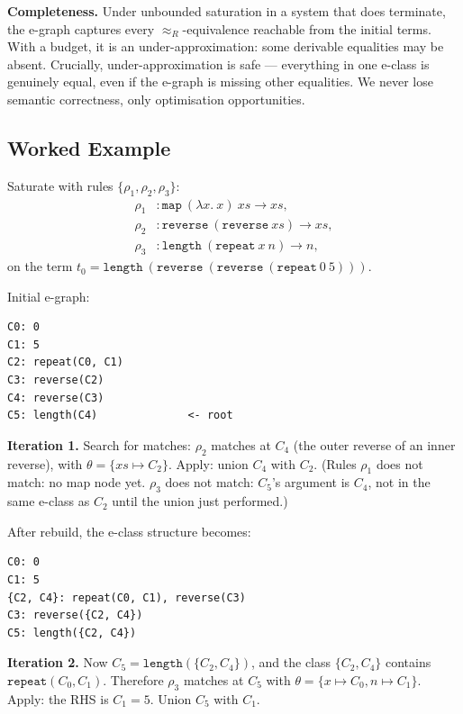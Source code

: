\documentclass[11pt,a4paper]{article}
\begin{document}
\textbf{Completeness.} Under unbounded saturation in a system that does terminate, the e-graph captures every $\approx_R$-equivalence reachable from the initial terms. With a budget, it is an under-approximation: some derivable equalities may be absent. Crucially, under-approximation is safe --- everything in one e-class is genuinely equal, even if the e-graph is missing other equalities. We never lose semantic correctness, only optimisation opportunities.

\subsection{Worked Example}\label{sec:sat-worked}

Saturate with rules $\{\rho_1, \rho_2, \rho_3\}$:
\begin{align*}
\rho_1 &: \mathtt{map}\ (\lambda x.\ x)\ xs \to xs, \\
\rho_2 &: \mathtt{reverse}\ (\mathtt{reverse}\ xs) \to xs, \\
\rho_3 &: \mathtt{length}\ (\mathtt{repeat}\ x\ n) \to n,
\end{align*}
on the term $t_0 = \mathtt{length}\ (\mathtt{reverse}\ (\mathtt{reverse}\ (\mathtt{repeat}\ 0\ 5)))$.

Initial e-graph:

\begin{lstlisting}
C0: 0
C1: 5
C2: repeat(C0, C1)
C3: reverse(C2)
C4: reverse(C3)
C5: length(C4)              <- root
\end{lstlisting}

\textbf{Iteration 1.} Search for matches: $\rho_2$ matches at $C_4$ (the outer reverse of an inner reverse), with $\theta = \{xs \mapsto C_2\}$. Apply: union $C_4$ with $C_2$. (Rules $\rho_1$ does not match: no map node yet. $\rho_3$ does not match: $C_5$'s argument is $C_4$, not in the same e-class as $C_2$ until the union just performed.)

After rebuild, the e-class structure becomes:

\begin{lstlisting}
C0: 0
C1: 5
{C2, C4}: repeat(C0, C1), reverse(C3)
C3: reverse({C2, C4})
C5: length({C2, C4})
\end{lstlisting}

\textbf{Iteration 2.} Now $C_5 = \mathtt{length}(\{C_2, C_4\})$, and the class $\{C_2, C_4\}$ contains $\mathtt{repeat}(C_0, C_1)$. Therefore $\rho_3$ matches at $C_5$ with $\theta = \{x \mapsto C_0, n \mapsto C_1\}$. Apply: the RHS is $C_1 = 5$. Union $C_5$ with $C_1$.
\end{document}
